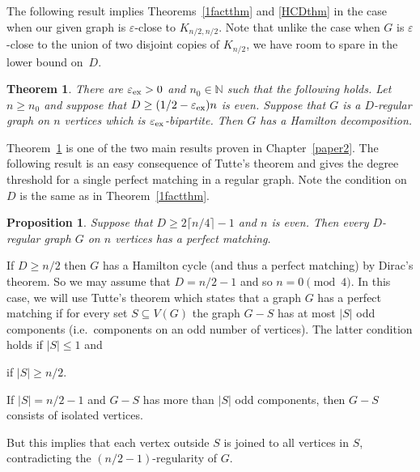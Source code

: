 \documentclass{memo-l}
\newtheorem{thm}[firstthm]{Theorem}
\newtheorem{prop}[firstthm]{Proposition}
\def\COMMENT#1{}
\def\proof{\removelastskip\penalty55\medskip\noindent{\bf Proof. }}
\def\eps{\varepsilon}
\numberwithin{section}{chapter}
\numberwithin{equation}{section}
\numberwithin{firstthm}{section}
\numberwithin{figure}{section}
\begin{document}
The following result implies Theorems~\ref{1factthm} and \ref{HCDthm} in the case when
our given graph is $\eps$-close to $K_{n/2,n/2}$.
Note that unlike the case when $G$ is $\eps$-close to the union of two disjoint copies of $K_{n/2}$, we have room to spare in the lower bound on~$D$.


\begin{thm}\label{1factbip}
There are $\eps_{\rm ex} >0$ and $n_0\in\mathbb{N}$ such that the following holds. Let $n\ge n_0$ and suppose that
$D \ge (1/2-\eps_{\rm ex})n$ is even. 
Suppose that $G$ is a $D$-regular graph on $n$ vertices which is $\eps_{\rm ex}$-bipartite.
Then $G$ has a Hamilton decomposition.
\end{thm}
Theorem~\ref{1factbip} is one of the two main results proven in Chapter~\ref{paper2}.
The following result is an easy consequence of Tutte's theorem
and gives the degree threshold for a single perfect matching in  a regular graph.
Note the condition on $D$ is the same as in Theorem~\ref{1factthm}.
\begin{prop}\label{singlematching}
Suppose that $D\ge 2\lceil n/4 \rceil -1$ and $n$ is even.
Then every $D$-regular graph $G$ on $n$ vertices has a perfect matching.
\end{prop}
\proof If $D\ge n/2$ then $G$ has a Hamilton cycle (and thus a perfect matching) by Dirac's theorem.
So we may assume that $D=n/2-1$ and so $n = 0 \pmod 4$. In this case, we will use Tutte's
theorem which states that a graph $G$ has a perfect matching if for every
set $S\subseteq V(G)$ the graph $G-S$ has at most $|S|$ odd components (i.e.~components on an odd number of vertices).
The latter condition  holds if $|S|\le 1$ and%
    \COMMENT{If $|S|=0$ then this follows since $n= 0\pmod 4$ (If $G$ is disconnected, it is the union of two cliques on $n/2$ vertices).
If $|S|=1$ then $G-S$ can have at most two components
(as $D\ge n/2-1$) and at most one of these can be odd (as $n$ is even).}
if $|S|\ge n/2$.

If $|S|=n/2-1$ and $G-S$ has more than $|S|$ odd components, then $G-S$ consists of isolated vertices.%
     \COMMENT{If one component has at least 3 vertices then we have at most $n/2+1-2=|S|$ components.
If $k\ge 1$ components are an edge, then have at most $n/2+1-k$ components and so at most $n/2+1-2k\le |S|$ odd components.}
%
But this implies that each vertex outside $S$ is joined to all vertices in $S$, contradicting the $(n/2-1)$-regularity of $G$.
\end{document}
